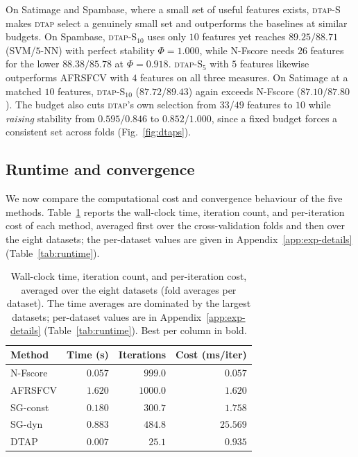\documentclass[]{interact}
\theoremstyle{plain}
\theoremstyle{definition}
\theoremstyle{remark}
\newcommand{\dtap}{\textsc{dtap}}
\begin{document}
On Satimage and Spambase, where a small set of useful features exists, \dtap-S makes \dtap{} select a genuinely small set and outperforms the baselines at similar budgets. On Spambase, \dtap-S$_{10}$ uses only $10$ features yet reaches $89.25/88.71$ (SVM/$5$-NN) with perfect stability $\Phi=1.000$, while N-Fscore needs $26$ features for the lower $88.38/85.78$ at $\Phi=0.918$. \dtap-S$_{5}$ with $5$ features likewise outperforms AFRSFCV with $4$ features on all three measures. On Satimage at a matched $10$ features, \dtap-S$_{10}$ ($87.72/89.43$) again exceeds N-Fscore ($87.10/87.80$). The budget also cuts \dtap's own selection from $33$/$49$ features to $10$ while \emph{raising} stability from $0.595/0.846$ to $0.852/1.000$, since a fixed budget forces a consistent set across folds (Fig.~\ref{fig:dtaps}).

\subsection{Runtime and convergence}\label{ssec:runtime}
We now compare the computational cost and convergence behaviour of the five methods. Table~\ref{tab:runtime-summary} reports the wall-clock time, iteration count, and per-iteration cost of each method, averaged first over the cross-validation folds and then over the eight datasets; the per-dataset values are given in Appendix~\ref{app:exp-details} (Table~\ref{tab:runtime}).

\begin{table}[htbp]
\centering\small
\caption{Wall-clock time, iteration count, and per-iteration cost, averaged over the eight datasets (fold averages per dataset). The time averages are dominated by the largest datasets; per-dataset values are in Appendix~\ref{app:exp-details} (Table~\ref{tab:runtime}). Best per column in bold.}\label{tab:runtime-summary}
\begin{tabular}{l rrr}
\toprule
Method   & Time (s)         & Iterations      & Cost (ms/iter)   \\
\midrule
N-Fscore & $0.057$          & $999.0$         & $\mathbf{0.057}$ \\
AFRSFCV  & $1.620$          & $1000.0$        & $1.620$          \\
SG-const & $0.180$          & $300.7$         & $1.758$          \\
SG-dyn   & $0.883$          & $484.8$         & $25.569$         \\
DTAP     & $\mathbf{0.007}$ & $\mathbf{25.1}$ & $0.935$          \\
\bottomrule
\end{tabular}
\end{table}
\end{document}
